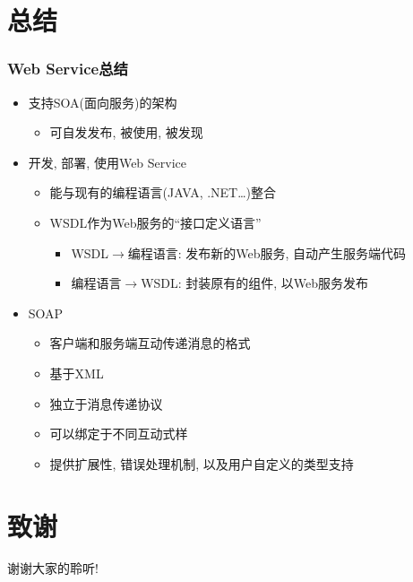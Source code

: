 \documentclass[CJKutf8,compress,hyperref]{beamer}
\begin{document}
\begin{CJK}{UTF8}{song}
  \section{总结} 
  \begin{frame}
          \frametitle{Web Service总结}
          \begin{itemize}
                  \item 支持SOA(面向服务)的架构
                          \begin{itemize}
                                  \item 可自发发布, 被使用, 被发现
                          \end{itemize}
                  \item 开发, 部署, 使用Web Service
                          \begin{itemize}
                                  \item 能与现有的编程语言(JAVA, .NET\ldots)整合 
                                  \item WSDL作为Web服务的“接口定义语言”
                                          \begin{itemize} 
                                                  \item WSDL$\rightarrow$编程语言: 发布新的Web服务, 自动产生服务端代码
                                                  \item 编程语言$\rightarrow$WSDL: 封装原有的组件, 以Web服务发布
                                          \end{itemize}
                          \end{itemize}
                  \item SOAP 
                          \begin{itemize}
                                  \item 客户端和服务端互动传递消息的格式
                                  \item 基于XML 
                                  \item 独立于消息传递协议
                                  \item 可以绑定于不同互动式样
                                  \item 提供扩展性, 错误处理机制, 以及用户自定义的类型支持
                          \end{itemize} 
          \end{itemize}
  \end{frame} 

  \section{致谢}
  \begin{frame}
          \begin{Huge}
                  \begin{center}
                          谢谢大家的聆听!
                  \end{center}
          \end{Huge}
  \end{frame}
   
\end{CJK}
\end{document}
